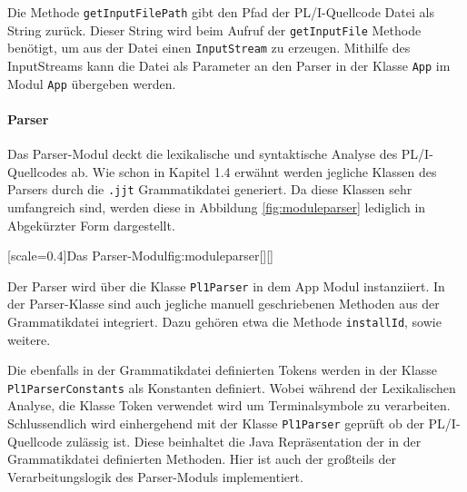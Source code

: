 Die Methode \verb+getInputFilePath+ gibt den Pfad der PL/I-Quellcode Datei als String zurück.
Dieser String wird beim Aufruf der \verb+getInputFile+ Methode benötigt, um aus der Datei einen \verb+InputStream+ zu erzeugen.
Mithilfe des InputStreams kann die Datei als Parameter an den Parser in der Klasse \verb+App+ im Modul \verb+App+
übergeben werden. 


\paragraph{Parser}
Das Parser-Modul deckt die lexikalische und syntaktische Analyse des PL/I-Quellcodes ab.
Wie schon in Kapitel 1.4 erwähnt werden jegliche Klassen des Parsers durch die \verb+.jjt+ Grammatikdatei generiert. Da diese Klassen sehr umfangreich sind, werden diese in Abbildung \ref{fig:moduleparser} lediglich in Abgekürzter Form dargestellt. 

[scale=0.4]{Das Parser-Modul}{fig:moduleparser}[][]
\pagebreak

Der Parser wird über die Klasse \verb+Pl1Parser+ in dem App Modul instanziiert. In der Parser-Klasse sind auch jegliche manuell geschriebenen Methoden aus der Grammatikdatei integriert. 
Dazu gehören etwa die Methode \verb+installId+, sowie weitere. 

Die ebenfalls in der Grammatikdatei definierten Tokens werden in der Klasse \verb+Pl1ParserConstants+ als Konstanten definiert. Wobei während der Lexikalischen Analyse, die Klasse Token verwendet wird um Terminalsymbole zu verarbeiten. 
Schlussendlich wird einhergehend mit der Klasse \verb+Pl1Parser+ geprüft ob der PL/I-Quellcode zulässig ist. 
Diese beinhaltet die Java Repräsentation der in der Grammatikdatei definierten Methoden. Hier ist auch der großteils der Verarbeitungslogik des Parser-Moduls implementiert.

